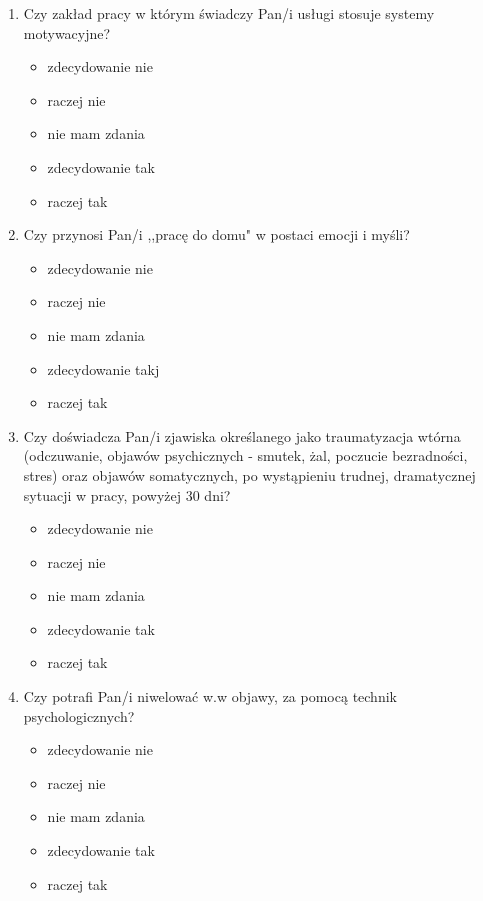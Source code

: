 \documentclass[a4paper,12pt,twoside,openright]{mwrep}
\begin{document}
\begin{appendices}
\begin{enumerate}[label=\arabic*)]
		
		\item{Czy zakład pracy w którym świadczy Pan/i usługi stosuje systemy motywacyjne?}
		\begin{itemize}
			\item{zdecydowanie nie}
			\item{raczej nie}
			\item{nie mam zdania}
			\item{zdecydowanie tak}
			\item{raczej tak}
		\end{itemize}
		\vspace{\baselineskip} 
		
		
		\item{Czy przynosi Pan/i ,,pracę do domu" w postaci emocji i myśli?}
		\begin{itemize}
			\item{zdecydowanie nie}
			\item{raczej nie}
			\item{nie mam zdania}
			\item{zdecydowanie takj}
			\item{raczej tak}
		\end{itemize}
		\vspace{\baselineskip}
		
		\item{ Czy doświadcza Pan/i zjawiska określanego jako traumatyzacja wtórna (odczuwanie, objawów psychicznych - smutek, żal, poczucie bezradności, stres) oraz objawów somatycznych, po wystąpieniu trudnej, dramatycznej sytuacji w pracy, powyżej 30 dni?}
		\begin{itemize}
		\item{zdecydowanie nie}
			\item{raczej nie}
			\item{nie mam zdania}
			\item{zdecydowanie tak}
			\item{raczej tak}
		\end{itemize}
		\vspace{\baselineskip} 
		
			\item{Czy potrafi Pan/i niwelować w.w objawy, za pomocą technik psychologicznych?}
		\begin{itemize}
			\item{zdecydowanie nie}
			\item{raczej nie}
			\item{nie mam zdania}
			\item{zdecydowanie tak}
			\item{raczej tak}
		\end{itemize}
		\vspace{\baselineskip}
		

\end{enumerate}
\end{appendices}
\end{document}
